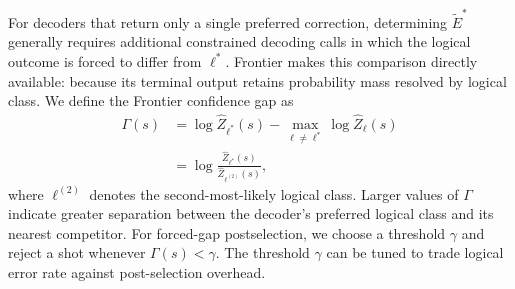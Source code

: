 For decoders that return only a single preferred correction, determining $\widetilde{E}^*$ generally requires additional constrained decoding calls in which the logical outcome is forced to differ from $\ell^*$. Frontier makes this comparison directly available: because its terminal output retains probability mass resolved by logical class.
We define the Frontier confidence gap as
\begin{align}
    \Gamma(s)
    &=
    \log \widehat{Z}_{\ell^*}(s)
    -
    \max_{\ell\neq\ell^*}
    \log \widehat{Z}_{\ell}(s) \\
    &=
    \log
    \frac{\widehat{Z}_{\ell^*}(s)}
    {\widehat{Z}_{\ell^{(2)}}(s)},
\end{align}
where $\ell^{(2)}$ denotes the second-most-likely logical class. Larger values of $\Gamma$ indicate greater separation between the decoder's preferred logical class and its nearest competitor. For forced-gap postselection, we choose a threshold $\gamma$ and reject a shot whenever $\Gamma(s)<\gamma$. The threshold $\gamma$ can be tuned to trade logical error rate against post-selection overhead.

